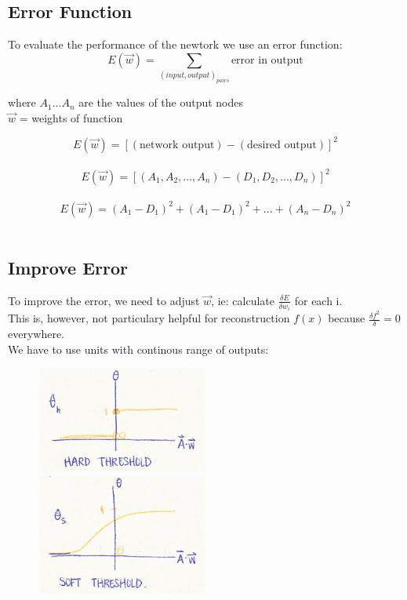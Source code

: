 \documentclass[english,11pt]{article}
\begin{document}
\subsection{Error Function}
To evaluate the performance of the newtork we use an error function:\\
\begin{equation}
E(\vec{w})=\sum_{(input,output)_{pairs}}\text{error in output}
\end{equation}
\begin{center}
where $A_1...A_n$ are the values of the output nodes\\$\vec{w}$ = weights of function
\end{center}
\begin{equation}
E(\vec{w})= [(\text{network output})-(\text{desired output})]^2
\end{equation}\\
\begin{equation}
E(\vec{w})= [(A_1,A_2,...,A_n)-(D_1,D_2,...,D_n)]^2
\end{equation}\\
\begin{equation}
E(\vec{w})= (A_1-D_1)^2+(A_1-D_1)^2+...+(A_n-D_n)^2
\end{equation}\\

\subsection{Improve Error}
To improve the error, we need to adjust $\vec{w}$, ie: calculate $\frac{\delta E}{\delta w_i}$ for each i.\\
This is, however, not particulary helpful for reconstruction $f(x)$ because $\frac{\delta f^2}{\delta}=0$ everywhere.\\
We have to use units with continous range of outputs:\\

\begin{figure}[h!]
  
  \centerline{\includegraphics[width=0.5\textwidth]{fnn_hard_threshold.png} \includegraphics[width=0.5\textwidth]{fnn_soft_threshold.png}}
\end{figure}
\end{document}
